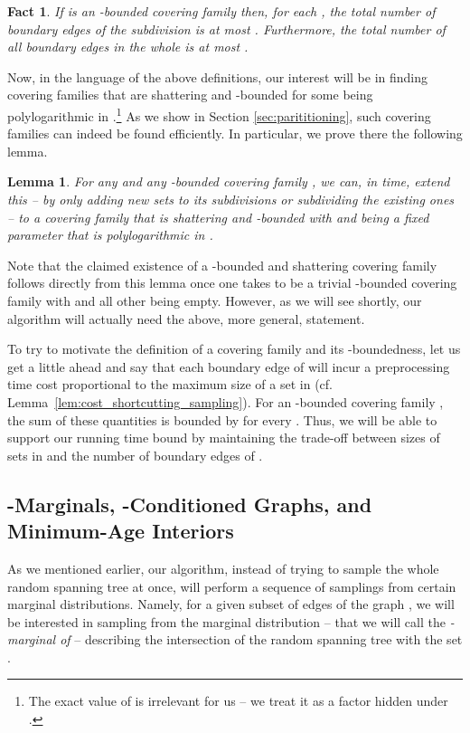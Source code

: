 \documentclass[11pt, letterpaper]{article}
\newtheorem{lemma}[theorem]{Lemma}
\newtheorem{fact}[theorem]{Fact}
\begin{document}
\begin{fact}
\label{fa:alpha_boundness_and_boundary_edges}
If  is an -bounded covering family then, for each , the total number of boundary edges of the subdivision  is at most . Furthermore, the total number of all boundary edges in the whole  is at most .
\end{fact}

Now, in the language of the above definitions, our interest will be in finding covering families that are shattering and -bounded for some  being polylogarithmic in .\footnote{The exact value of  is irrelevant for us -- we treat it as a factor hidden under .} As we show in Section \ref{sec:parititioning}, such covering families can indeed be found efficiently. In particular, we prove there the following lemma.

\begin{lemma}
\label{lem:partitioning_main}
For any  and any -bounded covering family , we can, in  time, extend this  -- by only adding new sets to its  subdivisions or subdividing the existing ones -- to a covering family  that is shattering and -bounded with  and  being a fixed parameter that is polylogarithmic in . 
\end{lemma}

Note that the claimed existence of a -bounded and shattering covering family follows directly from this lemma once one takes  to be a trivial -bounded covering family with  and all other  being empty. However, as we will see shortly, our algorithm will actually need the above, more general, statement.

To try to motivate the definition of a covering family and its -boundedness, let us get a little ahead and say that
each boundary edge of  will incur a preprocessing time cost proportional to the maximum size of a set in  (cf. Lemma~\ref{lem:cost_shortcutting_sampling}).
For an -bounded covering family , the sum of these quantities is bounded by  for every . Thus, we will be able to support our running time bound by maintaining the trade-off between sizes of sets in  and the number of boundary edges of .






\subsection{-Marginals, -Conditioned Graphs, and Minimum-Age Interiors}\label{sec:marginals_overview}

As we mentioned earlier, our algorithm, instead of trying to sample the whole random spanning tree at once, will perform a sequence of samplings from certain marginal distributions. Namely, for a given subset of edges  of the graph , we will be interested in sampling from the marginal distribution -- that we will call the {\em -marginal of } -- describing the intersection of the random spanning tree with the set . 
\end{document}
